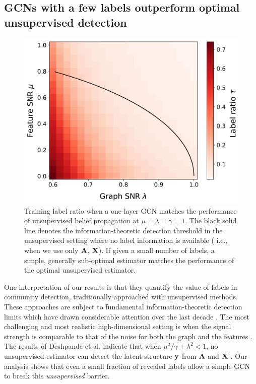 \documentclass[9pt,twocolumn]{pnas-new}
\begin{document}
\subsection*{GCNs with a few labels outperform optimal unsupervised detection}

\begin{figure}[t!]
    \centering
    \includegraphics[width=0.8\linewidth]{figs_heatmap.pdf}
    \caption{Training label ratio when a one-layer GCN matches the performance of unsupervised belief propagation at $\mu=\lambda=\gamma=1$. The black solid line denotes the information-theoretic detection threshold in the unsupervised setting where no label information is available ( i.e., when we use only $\mathbf{A}$, $\mathbf{X}$). If given a small number of labels, a simple, generally sub-optimal estimator matches the performance of the optimal unsupervised estimator.}
    \label{fig:super_vs_unsuper_heatmap}
\end{figure}

One interpretation of our results is that they quantify the value of labels in community detection, traditionally approached with unsupervised methods. These approaches are subject to fundamental information-theoretic detection limits which have drawn considerable attention over the last decade \cite{deshpande2017asymptotic,mossel2018proof,el2018detection}. The most challenging and most realistic high-dimensional setting is when the signal strength is comparable to that of the noise for both the graph and the features \cite{deshpande2018contextual, deshpande2017asymptotic,duranthon2023optimal}. The results of Deshpande et al. indicate that when $\mu^2 / \gamma +\lambda^2 < 1$, no unsupervised estimator can detect the latent structure $\mathbf{y}$ from $\mathbf{A}$ and $\mathbf{X}$ \cite{deshpande2018contextual}. Our analysis shows that even a small fraction of revealed labels allow a simple GCN to break this \emph{unsupervised} barrier. 
\end{document}

